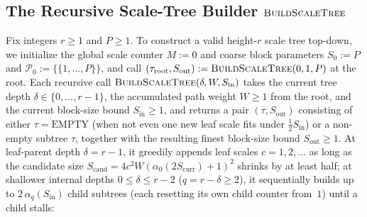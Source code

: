 \documentclass[11pt]{article}
\theoremstyle{definition}
\theoremstyle{remark}
\newcommand{\BuildScaleTree}{\textnormal{\scshape BuildScaleTree}}
\begin{document}
\subsection{The Recursive Scale-Tree Builder \texorpdfstring{$\BuildScaleTree$}{BuildScaleTree}}
\label{subsec:build-scale-tree}

Fix integers $r \ge 1$ and $P \ge 1$. To construct a valid height-$r$ scale tree top-down, we initialize the global scale counter $M := 0$ and coarse block parameters $S_0 := P$ and $\mathcal{P}_0 := \{\{1, \dots, P\}\}$, and call $(\tau_{\mathrm{root}}, S_{\mathrm{out}}) := \BuildScaleTree(0, 1, P)$ at the root. Each recursive call $\BuildScaleTree(\delta, W, S_{\mathrm{in}})$ takes the current tree depth $\delta \in \{0, \dots, r - 1\}$, the accumulated path weight $W \ge 1$ from the root, and the current block-size bound $S_{\mathrm{in}} \ge 1$, and returns a pair $(\tau, S_{\mathrm{out}})$ consisting of either $\tau = \mathrm{EMPTY}$ (when not even one new leaf scale fits under $\frac{1}{2} S_{\mathrm{in}}$) or a non-empty subtree $\tau$, together with the resulting finest block-size bound $S_{\mathrm{out}} \ge 1$. At leaf-parent depth $\delta = r - 1$, it greedily appends leaf scales $c = 1, 2, \dots$ as long as the candidate size $S_{\mathrm{cand}} = 4 c^2 W (\alpha_0(2 S_{\mathrm{curr}}) + 1)^2$ shrinks by at least half; at shallower internal depths $0 \le \delta \le r - 2$ ($q = r - \delta \ge 2$), it sequentially builds up to $2\,\alpha_q(S_{\mathrm{in}})$ child subtrees (each resetting its own child counter from~$1$) until a child stalls:
\end{document}
